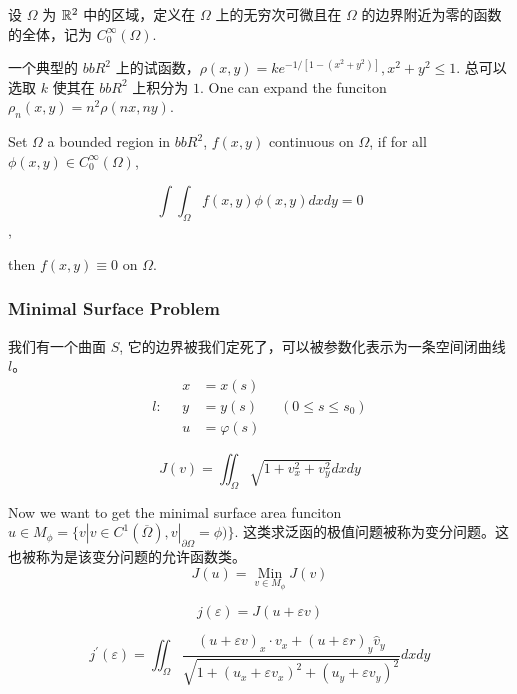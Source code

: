 \begin{definition}
设 $\Omega$ 为 ${\mathbb{R}}^2$ 中的区域，定义在 $\Omega$ 上的无穷次可微且在 $\Omega$ 的边界附近为零的函数的全体，记为 $C_0^\infty(\Omega)$.
\end{definition}

一个典型的 $bbR^2$ 上的试函数，$\rho(x,y)=ke^{-1/[1-(x^2+y^2)]}, x^2+y^2\leq 1$. 总可以选取 $k$ 使其在 $bbR^2$ 上积分为 $1$. One can expand the funciton $\rho_n(x,y)=n^2 \rho(nx,ny)$.

\begin{lemma}
Set $\Omega$ a bounded region in $bbR^2$, $f(x,y)$ continuous on $\Omega$, if for all $\phi(x,y)\in C_0^\infty (\Omega)$,

$$\int\int_{\Omega} f(x,y)\phi(x,y)dxdy=0$$,

then $f(x,y)\equiv 0$ on $\Omega$.
\end{lemma}

\subsubsection{Minimal Surface Problem}

我们有一个曲面 $S$, 它的边界被我们定死了，可以被参数化表示为一条空间闭曲线 $l$。
\begin{equation}
l:\quad\begin{aligned} x &=x(s) \\ y &=y(s) \\ u &=\varphi(s) \end{aligned} \quad\left(0 \leqslant s \leqslant s_{0}\right)
\end{equation}

\begin{equation}
J(v)=\iint_{\Omega} \sqrt{1+v_{x}^{2}+v_{y}^{2}} d x d y
\end{equation}

Now we want to get the minimal surface area funciton $u\in M_\phi=\{v|v\in C^1 (\overline{\Omega}),v|_{\partial \Omega}=\phi)\}$. 这类求泛函的极值问题被称为变分问题。这也被称为是该变分问题的允许函数类。
\begin{equation}
J(u)=\underset{v \in M_{\phi}}{\operatorname{Min}} J(v)
\end{equation}

\begin{equation}
	j(\varepsilon)=J(u+\varepsilon v)
\end{equation}

\begin{equation}
	j^{\prime}(\varepsilon)=\iint_{\Omega} \frac{(u+\varepsilon v)_{x} \cdot v_{x}+(u+\varepsilon r)_{y} \hat{v}_{y}}{\sqrt{1+\left(u_{x}+\varepsilon v_{x}\right)^{2}+\left(u_{y}+\varepsilon v_{y}\right)^{2}}} d x d y
\end{equation}

